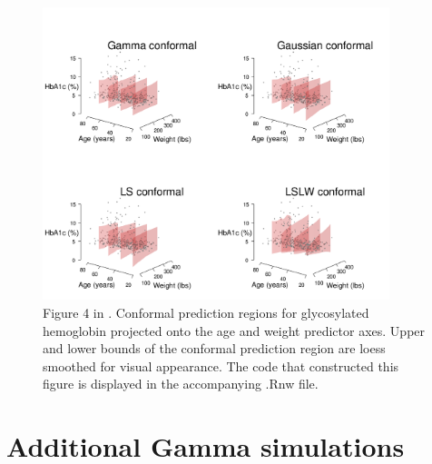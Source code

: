 \documentclass[11pt]{article}\usepackage[]{graphicx}\usepackage[]{color}
\begin{document}
\begin{figure}
\begin{center}

\includegraphics[width=0.9\textwidth]{conformal3ddiabetes.png}
\end{center}
\caption{ 
  Figure 4 in \citet{eck2019conformal}.
  Conformal prediction regions for glycosylated hemoglobin projected onto the 
  age and weight predictor axes.
  Upper and lower bounds of the conformal prediction region are loess smoothed for visual appearance.
  The code that constructed this figure is displayed in the accompanying .Rnw file.
}
\label{Fig:3d-conformal-regions}
\end{figure}





\newpage
\section{Additional Gamma simulations}
\label{sec:Gamma}
\end{document}
